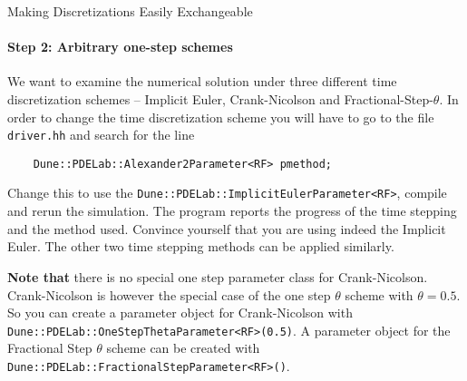 \documentclass[12pt,a4paper]{article}
\begin{document}
\begin{Exercise}{Making Discretizations Easily Exchangeable}
  \paragraph{Step 2: Arbitrary one-step schemes}
  We want to examine the numerical solution under three different time
  discretization schemes -- Implicit Euler, Crank-Nicolson and
  Fractional-Step-$\theta$. In order to change the time discretization
  scheme you will have to go to the file \lstinline!driver.hh! and
  search for the line
  \begin{lstlisting}
    Dune::PDELab::Alexander2Parameter<RF> pmethod;
  \end{lstlisting}
  Change this to use the
  \lstinline!Dune::PDELab::ImplicitEulerParameter<RF>!, compile and
  rerun the simulation. The program reports the progress of the time
  stepping and the method used. Convince yourself that you are using
  indeed the Implicit Euler. The other two time stepping methods can be
  applied similarly.

  \textbf{Note that} there is no special one step parameter class for
  Crank-Nicolson.  Crank-Nicolson is however the special case of the one
  step $\theta$ scheme with $\theta=0.5$.  So you can create a parameter
  object for Crank-Nicolson with
  \lstinline!Dune::PDELab::OneStepThetaParameter<RF>(0.5)!.  A parameter
  object for the Fractional Step $\theta$ scheme can be created with
  \lstinline!Dune::PDELab::FractionalStepParameter<RF>()!.


\end{Exercise}
\end{document}
